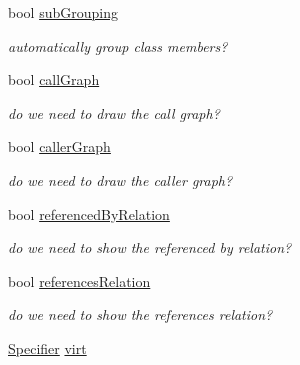 \begin{DoxyCompactItemize}
\mbox{\label{class_entry_a095b43379529186300dd6a8d8830d5dc}} 
bool \mbox{\hyperlink{class_entry_a095b43379529186300dd6a8d8830d5dc}{sub\+Grouping}}
\begin{DoxyCompactList}\small\item\em automatically group class members? \end{DoxyCompactList}\item 
\mbox{\label{class_entry_ac3b5637ee0f8469650e2d8d694733314}} 
bool \mbox{\hyperlink{class_entry_ac3b5637ee0f8469650e2d8d694733314}{call\+Graph}}
\begin{DoxyCompactList}\small\item\em do we need to draw the call graph? \end{DoxyCompactList}\item 
\mbox{\label{class_entry_a3693baa860ccc1625b5ac4fd3bc1761c}} 
bool \mbox{\hyperlink{class_entry_a3693baa860ccc1625b5ac4fd3bc1761c}{caller\+Graph}}
\begin{DoxyCompactList}\small\item\em do we need to draw the caller graph? \end{DoxyCompactList}\item 
\mbox{\label{class_entry_aa51a555e5a5d9e13ff22744c497fde8f}} 
bool \mbox{\hyperlink{class_entry_aa51a555e5a5d9e13ff22744c497fde8f}{referenced\+By\+Relation}}
\begin{DoxyCompactList}\small\item\em do we need to show the referenced by relation? \end{DoxyCompactList}\item 
\mbox{\label{class_entry_ae81d3d6d002609ca561367d00d25f7c8}} 
bool \mbox{\hyperlink{class_entry_ae81d3d6d002609ca561367d00d25f7c8}{references\+Relation}}
\begin{DoxyCompactList}\small\item\em do we need to show the references relation? \end{DoxyCompactList}\item 
\mbox{\label{class_entry_aaf045b9c026443fd192064117083911b}} 
\mbox{\hyperlink{types_8h_ab16236bdd10ddf4d73a9847350f0017e}{Specifier}} \mbox{\hyperlink{class_entry_aaf045b9c026443fd192064117083911b}{virt}}

\end{DoxyCompactItemize}
